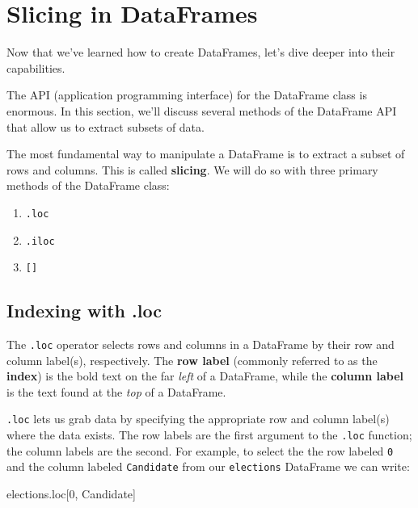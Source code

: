 \documentclass[
  letterpaper,
  DIV=11,
  numbers=noendperiod]{scrreprt}
\newenvironment{Shaded}{\begin{snugshade}}{\end{snugshade}}
\newcommand{\DecValTok}[1]{\textcolor[rgb]{0.68,0.00,0.00}{#1}}
\newcommand{\NormalTok}[1]{\textcolor[rgb]{0.00,0.23,0.31}{#1}}
\newcommand{\StringTok}[1]{\textcolor[rgb]{0.13,0.47,0.30}{#1}}
\providecommand{\tightlist}{%
  \setlength{\itemsep}{0pt}\setlength{\parskip}{0pt}}\usepackage{longtable,booktabs,array}
\begin{document}
\hypertarget{slicing-in-dataframes}{%
\section{Slicing in DataFrames}\label{slicing-in-dataframes}}

Now that we've learned how to create DataFrames, let's dive deeper into
their capabilities.

The API (application programming interface) for the DataFrame class is
enormous. In this section, we'll discuss several methods of the
DataFrame API that allow us to extract subsets of data.

The most fundamental way to manipulate a DataFrame is to extract a
subset of rows and columns. This is called \textbf{slicing}. We will do
so with three primary methods of the DataFrame class:

\begin{enumerate}
\def\labelenumi{\arabic{enumi}.}
\tightlist
\item
  \texttt{.loc}
\item
  \texttt{.iloc}
\item
  \texttt{{[}{]}}
\end{enumerate}

\hypertarget{indexing-with-.loc}{%
\subsection{Indexing with .loc}\label{indexing-with-.loc}}

The \texttt{.loc} operator selects rows and columns in a DataFrame by
their row and column label(s), respectively. The \textbf{row label}
(commonly referred to as the \textbf{index}) is the bold text on the far
\emph{left} of a DataFrame, while the \textbf{column label} is the text
found at the \emph{top} of a DataFrame.

\texttt{.loc} lets us grab data by specifying the appropriate row and
column label(s) where the data exists. The row labels are the first
argument to the \texttt{.loc} function; the column labels are the
second. For example, to select the the row labeled \texttt{0} and the
column labeled \texttt{Candidate} from our \texttt{elections} DataFrame
we can write:

\begin{Shaded}
\begin{Highlighting}[]
\NormalTok{elections.loc[}\DecValTok{0}\NormalTok{, }\StringTok{\textquotesingle{}Candidate\textquotesingle{}}\NormalTok{]}
\end{Highlighting}
\end{Shaded}
\end{document}
